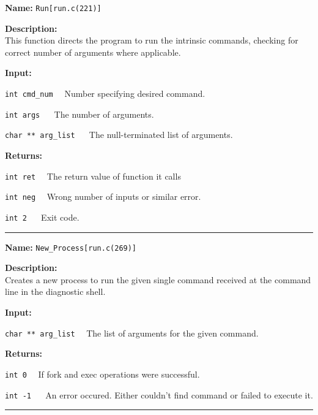 \documentclass[11pt,a4paper]{article}
\begin{document}
\begin{description}
\item \textbf{Name:} 
\verb|Run[run.c(221)]|

\item \textbf{Description:}\\
 This function directs the program to run the intrinsic commands, checking for correct number of arguments where applicable.

\item \textbf{Input:}
\begin{description}
\item \verb|int cmd_num|~~ Number specifying desired command.
\item \verb|int args| ~~ The number of arguments.
\item \verb|char ** arg_list| ~~ The null-terminated list of arguments.
\end{description}

\item \textbf{Returns:}
\begin{description}
\item \verb|int ret|~~ The return value of function it calls
\item \verb|int neg|~~ Wrong number of inputs or similar error.
\item \verb|int 2| ~~ Exit code.
\end{description}
\end{description}\hrule

\begin{description}
\item \textbf{Name:} 
\verb|New_Process[run.c(269)]|

\item \textbf{Description:}\\
Creates a new process to run the given single command received at the command line in the diagnostic shell.

\item \textbf{Input:}
\begin{description}
\item \verb|char ** arg_list|~~ The list of arguments for the given command.
\end{description}

\item \textbf{Returns:}
\begin{description}
\item \verb|int 0|~~ If fork and exec operations were successful.
\item \verb|int -1| ~~ An error occured. Either couldn't find command or failed to execute it.
\end{description}
\end{description}\hrule
\end{document}
